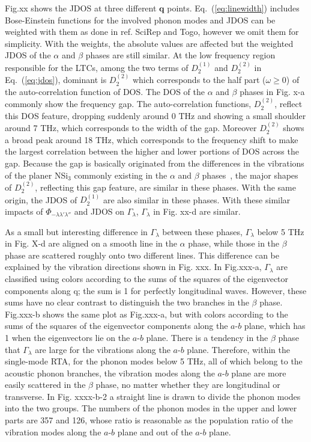 \documentclass[twocolumn,amsmath,amssymb,a4paper,prb,superscriptaddress,floatfix]{revtex4-1}
\begin{document}
Fig.xx shows the JDOS at three different $\mathbf{q}$ points.
Eq.~(\ref{eq:linewidth}) includes Bose-Einstein functions for the involved
phonon modes and JDOS can be weighted with them as done in ref. SciRep and
Togo, however we omit them for simplicity.  With the weights, the absolute
values are affected but the weighted JDOS of the $\alpha$ and $\beta$ phases
are still similar. At the low frequency region responsible for the LTCs, among
the two terms of $D_2^{(1)}$ and $D_2^{(2)}$ in Eq.~(\ref{eq:jdos}), dominant
is $D_2^{(2)}$ which corresponds to the half part ($\omega \geq  0$) of the
auto-correlation function of DOS. The DOS of the $\alpha$ and $\beta$ phases in
Fig. x-a commonly show the frequency gap.  The auto-correlation functions,
$D_2^{(2)}$, reflect this DOS feature, dropping suddenly around 0 THz and
showing a small shoulder around 7 THz, which corresponds to the width of the
gap. Moreover $D_2^{(2)}$ shows a broad peak around 18 THz, which corresponds
to the frequency shift to make the largest correlation between the higher and
lower portions of DOS across the gap. Because the gap is basically originated
from the differences in the vibrations of the planer NSi$_3$ commonly existing
in the $\alpha$ and $\beta$ phases~\cite{kuwabara}, the major shapes of
$D_2^{(2)}$, reflecting this gap feature, are similar in these phases. With the
same origin, the JDOS of $D_2^{(1)}$ are also similar in these phases. With
these similar impacts of $\Phi_{-\lambda\lambda'\lambda''}$ and JDOS on
$\Gamma_\lambda$, $\Gamma_\lambda$ in Fig. xx-d are similar.  

As a small but interesting difference in $\Gamma_\lambda$ between these phases,
$\Gamma_\lambda$ below 5 THz in Fig. X-d are aligned on a smooth line in the $\alpha$ phase, while
those in the $\beta$ phase are scattered roughly onto two different lines. This
difference can be explained by the vibration directions shown in Fig. xxx. In
Fig.xxx-a, $\Gamma_\lambda$ are classified using colors according to the sums of the squares
of the eigenvector components along q; the sum is 1 for perfectly longitudinal
waves. However, these sums have no clear contrast to distinguish the two
branches in the $\beta$ phase.  Fig.xxx-b shows the same plot as Fig.xxx-a, but with
colors according to the sums of the squares of the eigenvector components along
the $a$-$b$ plane, which has 1 when the eigenvectors lie on the $a$-$b$ plane. There is
a tendency in the $\beta$ phase that  $\Gamma_\lambda$ are large for the vibrations along the $a$-$b$
plane. Therefore, within the single-mode RTA, for the phonon modes below 5 THz,
all of which belong to the acoustic phonon branches, the vibration modes along
the $a$-$b$ plane are more easily scattered in the $\beta$ phase, no matter whether they
are longitudinal or transverse. In Fig. xxxx-b-2 a straight line is drawn to
divide the phonon modes into the two groups. The numbers of the phonon modes in
the upper and lower parts are 357 and 126, whose ratio is reasonable as the
population ratio of the vibration modes along the $a$-$b$ plane and out of the $a$-$b$
plane.
\end{document}
